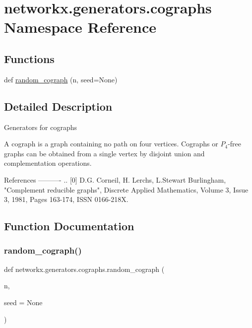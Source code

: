 \hypertarget{namespacenetworkx_1_1generators_1_1cographs}{}\section{networkx.\+generators.\+cographs Namespace Reference}
\label{namespacenetworkx_1_1generators_1_1cographs}
\subsection*{Functions}
\begin{DoxyCompactItemize}
\item 
def \hyperlink{namespacenetworkx_1_1generators_1_1cographs_ab021c4f99501088f5ac427ee24f33522}{random\+\_\+cograph} (n, seed=None)
\end{DoxyCompactItemize}


\subsection{Detailed Description}
\begin{DoxyVerb}Generators for cographs

A cograph is a graph containing no path on four vertices.
Cographs or $P_4$-free graphs can be obtained from a single vertex
by disjoint union and complementation operations.

References
----------
.. [0] D.G. Corneil, H. Lerchs, L.Stewart Burlingham,
    "Complement reducible graphs",
    Discrete Applied Mathematics, Volume 3, Issue 3, 1981, Pages 163-174,
    ISSN 0166-218X.
\end{DoxyVerb}
 

\subsection{Function Documentation}
\mbox{\label{namespacenetworkx_1_1generators_1_1cographs_ab021c4f99501088f5ac427ee24f33522}} 
\subsubsection{\texorpdfstring{random\+\_\+cograph()}{random\_cograph()}}
{\footnotesize\ttfamily def networkx.\+generators.\+cographs.\+random\+\_\+cograph (\begin{DoxyParamCaption}\item[{}]{n,  }\item[{}]{seed = {\ttfamily None} }\end{DoxyParamCaption})}


